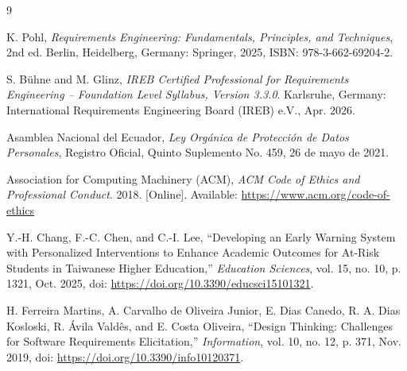 \documentclass[11pt,a4paper]{article}
\begin{document}
\begin{thebibliography}{9}

K. Pohl, \emph{Requirements Engineering: Fundamentals, Principles, and Techniques}, 2nd ed. Berlin, Heidelberg, Germany: Springer, 2025, ISBN: 978-3-662-69204-2.

S. B\"uhne and M. Glinz, \emph{IREB Certified Professional for Requirements Engineering -- Foundation Level Syllabus, Version 3.3.0}. Karlsruhe, Germany: International Requirements Engineering Board (IREB) e.V., Apr. 2026.

Asamblea Nacional del Ecuador, \emph{Ley Org\'anica de Protecci\'on de Datos Personales}, Registro Oficial, Quinto Suplemento No. 459, 26 de mayo de 2021.

Association for Computing Machinery (ACM), \emph{ACM Code of Ethics and Professional Conduct}. 2018. [Online]. Available: \url{https://www.acm.org/code-of-ethics}

Y.-H. Chang, F.-C. Chen, and C.-I. Lee, ``Developing an Early Warning System with Personalized Interventions to Enhance Academic Outcomes for At-Risk Students in Taiwanese Higher Education,'' \emph{Education Sciences}, vol. 15, no. 10, p. 1321, Oct. 2025, doi: \url{https://doi.org/10.3390/educsci15101321}.

H. Ferreira Martins, A. Carvalho de Oliveira Junior, E. Dias Canedo, R. A. Dias Kosloski, R. \'Avila Vald\^es, and E. Costa Oliveira, ``Design Thinking: Challenges for Software Requirements Elicitation,'' \emph{Information}, vol. 10, no. 12, p. 371, Nov. 2019, doi: \url{https://doi.org/10.3390/info10120371}.

\end{thebibliography}
\end{document}

